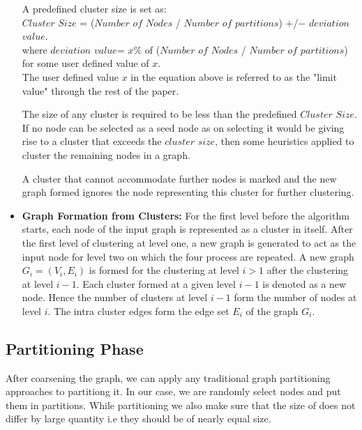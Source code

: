 \documentclass[letterpaper]{article}
\begin{document}
\begin{itemize}
\begin{itemize}
\end{itemize} %

A predefined cluster size is set as:\\

$Cluster$ $Size$ = ($Number$ $of$ $Nodes$ / $Number$ $of$ $partitions$) $+$/$-$ $deviation$ $value$.\\

where $deviation$ $value$= $x\%$ of ($Number$ $of$ $Nodes$ / $Number$ $of$ $partitions$) for some user defined value of $x$.\\ 


The user defined value $x$ in the equation above is referred to as the "limit value" through the rest of the paper.

The size of any cluster is required to be less than the predefined $Cluster$ $Size$. If no node can be selected as a seed node as on selecting it would be giving rise to a cluster that exceeds the $cluster$ $size$, then some heuristics applied to cluster the remaining nodes in a graph.  

A cluster that cannot accommodate further nodes is marked and the new graph formed ignores the node representing this cluster for further clustering. 



\item \textbf{Graph Formation from Clusters:} For the first level before the algorithm starts, each node of the input graph is represented as a cluster in itself. After the first level of clustering at level one, a new graph is generated to act as the input node for level two on which the four process are repeated. A new graph $G_i=(V_i, E_i)$ is formed for the clustering at level $i > 1$ after the clustering at level $i-1$. Each cluster formed at a given level $i-1$ is denoted as a new node. Hence the number of clusters at level $i-1$ form the number of nodes at level $i$. The intra cluster edges form the edge set $E_i$ of the graph $G_i$.




\end{itemize} %

\subsection{Partitioning Phase}
After coarsening the graph, we can apply any traditional graph partitioning approaches to partitiong it. In our
case, we are randomly select nodes and put them in partitions. While partitioning we also make sure that the
size of does not differ by large quantity i.e they should be of nearly equal size.
\end{document}
